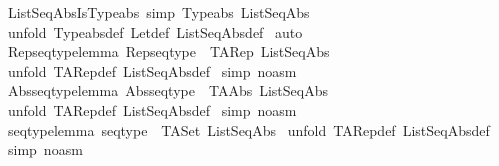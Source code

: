 \begin{isabellebody}
\ ListSeqAbsIsTypeabs\ {\isacharbrackleft}simp{\isacharbrackright}{\isacharcolon}\ {\isachardoublequoteopen}Typeabs\ ListSeqAbs{\isachardoublequoteclose}\isanewline
%
\isadelimproof
%
\endisadelimproof
%
\isatagproof
{}\isamarkupfalse%
\ {\isacharparenleft}unfold\ Typeabs{\isacharunderscore}def\ Let{\isacharunderscore}def\ ListSeqAbs{\isacharunderscore}def{\isacharparenright}\isanewline
{}\isamarkupfalse%
\ auto\isanewline
{}\isamarkupfalse%
%
\endisatagproof
{\isafoldproof}%
%
\isadelimproof
\isanewline
%
\endisadelimproof
\isanewline
\isanewline
{}\isamarkupfalse%
\ Rep{\isacharunderscore}seqtype{\isacharunderscore}lemma{\isacharcolon}\ {\isachardoublequoteopen}Rep{\isacharunderscore}seqtype\ {\isacharequal}\ TARep\ ListSeqAbs{\isachardoublequoteclose}\isanewline
%
\isadelimproof
%
\endisadelimproof
%
\isatagproof
{}\isamarkupfalse%
\ {\isacharparenleft}unfold\ TARep{\isacharunderscore}def\ ListSeqAbs{\isacharunderscore}def{\isacharparenright}\isanewline
{}\isamarkupfalse%
\ {\isacharparenleft}simp\ {\isacharparenleft}no{\isacharunderscore}asm{\isacharparenright}{\isacharparenright}\isanewline
{}\isamarkupfalse%
%
\endisatagproof
{\isafoldproof}%
%
\isadelimproof
\isanewline
%
\endisadelimproof
\isanewline
{}\isamarkupfalse%
\ Abs{\isacharunderscore}seqtype{\isacharunderscore}lemma{\isacharcolon}\ {\isachardoublequoteopen}Abs{\isacharunderscore}seqtype\ {\isacharequal}\ TAAbs\ ListSeqAbs{\isachardoublequoteclose}\isanewline
%
\isadelimproof
%
\endisadelimproof
%
\isatagproof
{}\isamarkupfalse%
\ {\isacharparenleft}unfold\ TARep{\isacharunderscore}def\ ListSeqAbs{\isacharunderscore}def{\isacharparenright}\isanewline
{}\isamarkupfalse%
\ {\isacharparenleft}simp\ {\isacharparenleft}no{\isacharunderscore}asm{\isacharparenright}{\isacharparenright}\isanewline
{}\isamarkupfalse%
%
\endisatagproof
{\isafoldproof}%
%
\isadelimproof
\isanewline
%
\endisadelimproof
\isanewline
{}\isamarkupfalse%
\ seqtype{\isacharunderscore}lemma{\isacharcolon}\ {\isachardoublequoteopen}seqtype\ {\isacharequal}\ TASet\ ListSeqAbs{\isachardoublequoteclose}\isanewline
%
\isadelimproof
%
\endisadelimproof
%
\isatagproof
{}\isamarkupfalse%
\ {\isacharparenleft}unfold\ TARep{\isacharunderscore}def\ ListSeqAbs{\isacharunderscore}def{\isacharparenright}\isanewline
{}\isamarkupfalse%
\ {\isacharparenleft}simp\ {\isacharparenleft}no{\isacharunderscore}asm{\isacharparenright}{\isacharparenright}\isanewline

\end{isabellebody}
